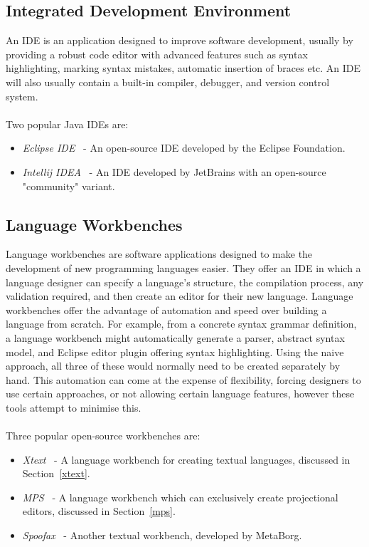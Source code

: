 \documentclass{article}
\begin{document}
\subsection{Integrated Development Environment}
An IDE is an application designed to improve software development, usually by providing a robust code editor with advanced features such as syntax highlighting, marking syntax mistakes, automatic insertion of braces etc. An IDE will also usually contain a built-in compiler, debugger, and version control system. 
\\
\\
Two popular Java IDEs are:
\begin{itemize}
\item \emph{Eclipse IDE}~\cite{eclipse} - An open-source IDE developed by the Eclipse Foundation.
\item \emph{Intellij IDEA}~\cite{intellij} - An IDE developed by JetBrains with an open-source "community" variant.
\end{itemize}
%
\subsection{Language Workbenches}
Language workbenches are software applications designed to make the development of new programming languages easier. They offer an IDE in which a language designer can specify a language's structure, the compilation process, any validation required, and then create an editor for their new language. Language workbenches offer the advantage of automation and speed over building a language from scratch. For example, from a concrete syntax grammar definition, a language workbench might automatically generate a parser, abstract syntax model, and Eclipse editor plugin offering syntax highlighting. Using the naive approach, all three of these would normally need to be created separately by hand. This automation can come at the expense of flexibility, forcing designers to use certain approaches, or not allowing certain language features, however these tools attempt to minimise this. 
\\
\\
Three popular open-source workbenches are:
\begin{itemize}
\item \emph{Xtext}~\cite{xtext} - A language workbench for creating textual languages, discussed in Section~\ref{xtext}.
\item \emph{MPS}~\cite{mps} - A language workbench which can exclusively create projectional editors, discussed in Section~\ref{mps}.
\item \emph{Spoofax}~\cite{spoofax} - Another textual workbench, developed by MetaBorg. 
\end{itemize}
%
\end{document}
